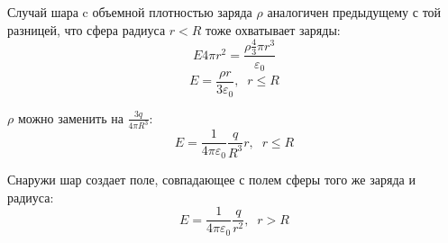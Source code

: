 \documentclass{article}
\begin{document}
	Случай шара c объемной плотностью заряда $\rho$ аналогичен предыдущему с той разницей, что сфера радиуса $r<R$ тоже охватывает заряды:
	\begin{equation}
		E4\pi r^2 = \frac{\rho \frac{4}{3}\pi r^3}{\varepsilon_0}
	\end{equation}
	\begin{equation}
		E = \frac{\rho r}{3\varepsilon_0}, \;\; r\leq R
	\end{equation}

	$\rho$ можно заменить на $\frac{3q}{4\pi R^3}$:
	\begin{equation}
		E = \frac{1}{4\pi\varepsilon_0}\frac{q}{R^3}r, \;\; r\leq R
	\end{equation}	

	Снаружи шар создает поле, совпадающее с полем сферы того же заряда и радиуса:
	\begin{equation}
		E = \frac{1}{4\pi\varepsilon_0}\frac{q}{r^2}, \;\; r>R
	\end{equation}
\end{document}
